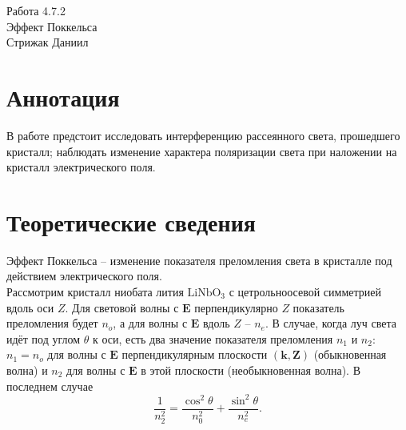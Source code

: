 



\begin{center}
  \LARGE{Работа 4.7.2}\\[0.2cm]
  \LARGE{Эффект Поккельса}\\[0.2cm]
  \large{Стрижак Даниил}\\[0.2cm]
\end{center}  
  

\section{Аннотация}

В работе предстоит исследовать интерференцию рассеянного света, прошедшего кристалл; наблюдать изменение характера поляризации света при наложении на кристалл электрического поля.

\section{Теоретические сведения}

Эффект Поккельса -- изменение показателя преломления света в кристалле под действием электрического поля.\\
Рассмотрим кристалл ниобата лития $\text{LiNbO}_3$ с цетрольноосевой симметрией вдоль оси $Z$. Для световой волны с $\mathbf{E}$ перпендикулярно $Z$ показатель преломления будет $n_o$, а для волны с $\mathbf{E}$ вдоль $Z$ -- $n_e$. В случае, когда луч света идёт под углом $\theta$ к оси, есть два значение показателя преломления $n_1$ и $n_2$: $n_1 = n_o$ для волны с $\mathbf{E}$ перпендикулярным плоскости $(\mathbf{k},\mathbf{Z})$ (обыкновенная волна) и $n_2$ для волны с $\mathbf{E}$ в этой плоскости (необыкновенная волна). В последнем случае
\begin{equation}
\dfrac{1}{n_2^2}=\dfrac{\cos^2 \theta}{n_0^2}+\dfrac{\sin^2 \theta}{n_e^2}.
\end{equation}


